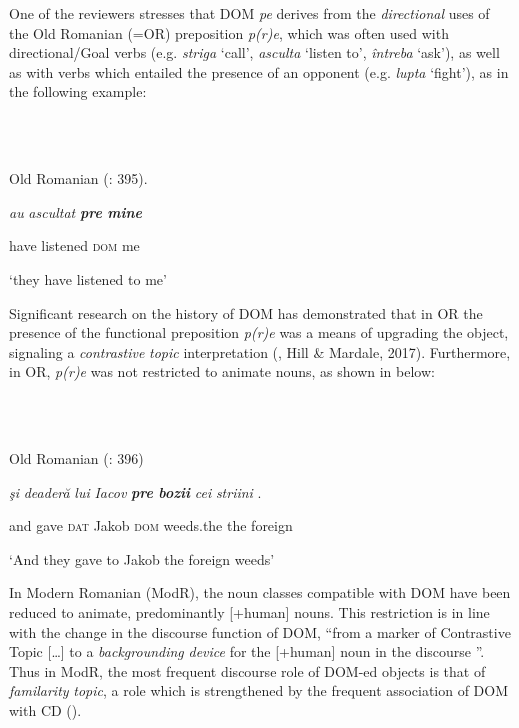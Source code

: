\documentclass[output=paper,modfonts,nonflat]{langsci/langscibook}
\begin{document}
One of the reviewers stresses that DOM \textit{pe} derives from the \textit{directional} uses of the Old Romanian (=OR) preposition \textit{p(r)e}, which was often used with directional/Goal verbs (e.g. \textit{striga} ‘call’, \textit{asculta} ‘listen to’, \textit{întreba} ‘ask’), as well as with verbs which entailed the presence of an opponent (e.g. \textit{lupta} ‘fight’), as in the following example: 

\ea%
    \label{ex:key:22}
    \gll\\
        \\
    \glt
    \z

          Old Romanian (\citealt{HillMardale2017}: 395).

\textit{au}  \textit{ascultat}  \textbf{\textit{pre} \textit{mine}}

  have listened   \textsc{dom} me

  ‘they have listened to me’

Significant research on the history of DOM has demonstrated that in OR the presence of the functional preposition \textit{p(r)e} was a means of upgrading the object, signaling a \textit{contrastive} \textit{topic} interpretation (\citealt{Hill2013}, Hill \& Mardale, 2017). Furthermore, in OR, \textit{p(r)e} was not restricted to animate nouns, as shown in  below:

\ea%
    \label{ex:key:23}
    \gll\\
        \\
    \glt
    \z

          Old Romanian  (\citealt{HillMardale2017}: 396)

\textit{şi} \textit{deaderă}  \textit{lui}  \textit{Iacov}\textbf{  \textit{pre} \textit{bozii}  }\textit{cei}  \textit{striini} .

  and gave   \textsc{dat} Jakob  \textsc{dom} weeds.the  the foreign

  ‘And they gave to Jakob the foreign weeds’

In Modern Romanian (ModR), the noun classes compatible with DOM have been reduced to animate, predominantly [+human] nouns. This restriction is in line with the change in the discourse function of DOM, “from a marker of Contrastive Topic […] to a \textit{backgrounding} \textit{device} for the [+human] noun in the discourse \citep[147]{Hill2013}”. Thus in ModR, the most frequent discourse role of DOM-ed objects is that of \textit{familarity} \textit{topic}, a role which is strengthened by the frequent association of DOM with CD (\citealt{HillMardale2017}).
\end{document}
